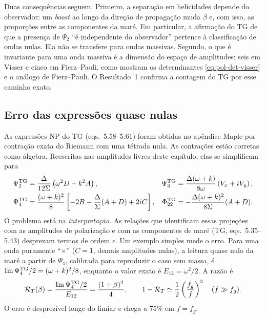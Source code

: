 Duas consequências seguem. Primeiro, a separação em helicidades depende
do observador: um \emph{boost} ao longo da direção de propagação muda
$\beta$ e, com isso, as proporções entre as componentes da maré. Em
particular, a afirmação do TG de que a presença de $\Psi_2$ ``é
independente do observador'' pertence à classificação de ondas nulas.
Ela não se transfere para ondas massivas. Segundo, o que é invariante
para uma onda massiva é a dimensão do espaço de amplitudes: seis em
Visser e cinco em Fierz--Pauli, como mostram os determinantes
\eqref{eq:pol-det-visser} e o análogo de Fierz--Pauli. O
Resultado~1 confirma a contagem do TG por esse caminho exato.

\subsection{Erro das expressões quase nulas}

As expressões NP do TG (eqs.~5.58--5.61) foram obtidas no apêndice
Maple por contração exata do Riemann com uma tétrada nula. As
contrações estão corretas como álgebra. Reescritas nas amplitudes livres
deste capítulo, elas se simplificam para
\begin{equation}
 \begin{aligned}
 \Psi_2^{\rm TG}&=\frac{\Delta}{12\Sigma}\left(\omega^2D-k^2A\right),&
 \Psi_3^{\rm TG}&=\frac{\Delta(\omega+k)}{8\omega}\left(V_x+iV_y\right),\\
 \Psi_4^{\rm TG}&=\frac{(\omega+k)^2}{8}
 \left[-2B-\frac{\Delta}{\Sigma}(A+D)+2iC\right],&
 \Phi_{22}^{\rm TG}&=-\frac{\Delta(\omega+k)^2}{8\Sigma}(A+D).
 \end{aligned}
 \label{eq:pol-np-tg}
\end{equation}
O problema está na \emph{interpretação}. As relações que identificam
essas projeções com as amplitudes de polarização e com as componentes
de maré (TG, eqs.~5.35--5.43) desprezam termos de ordem $\epsilon$. Um
exemplo simples mede o erro. Para uma onda puramente ``$\times$''
($C=1$, demais amplitudes nulas), a leitura quase nula da maré a partir
de $\Psi_4$, calibrada para reproduzir o caso sem massa, é
$\operatorname{Im}\Psi_4^{\rm TG}/2=(\omega+k)^2/8$, enquanto o valor
exato é $E_{12}=\omega^2/2$. A razão é
\begin{equation}
 \mathcal R_T(\beta)=\frac{\operatorname{Im}\Psi_4^{\rm TG}/2}{E_{12}}
 =\frac{(1+\beta)^2}{4},
 \qquad 1-\mathcal R_T\simeq\frac12\left(\frac{f_g}{f}\right)^2
 \quad(f\gg f_g).
 \label{eq:pol-erro-np}
\end{equation}
O erro é desprezível longe do limiar e chega a 75\% em $f=f_g$.

